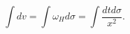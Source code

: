 \begin{equation}\label{Measure}
\int dv=\int \omega_{H} d\sigma=\int\frac{dt d\sigma}{x^2}.
\end{equation}

